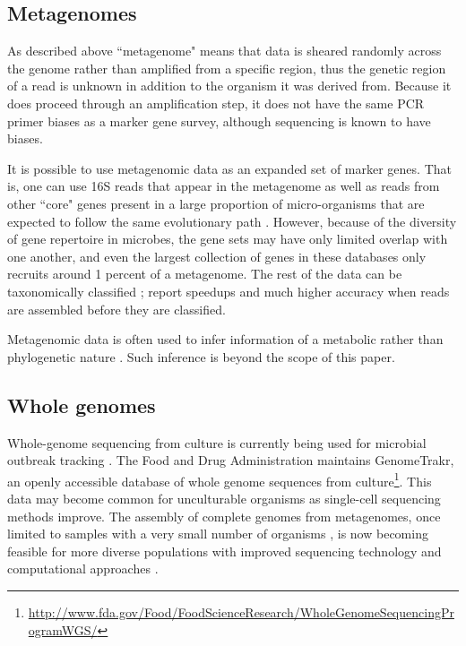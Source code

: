 \documentclass{amsart}
\begin{document}
\subsection{Metagenomes}
As described above ``metagenome" means that data is sheared randomly across the genome rather than amplified from a specific region, thus the genetic region of a read is unknown in addition to the organism it was derived from.
Because it does proceed through an amplification step, it does not have the same PCR primer biases as a marker gene survey, although sequencing is known to have biases.

It is possible to use metagenomic data as an expanded set of marker genes.
That is, one can use 16S reads that appear in the metagenome as well as reads from other ``core" genes present in a large proportion of micro-organisms that are expected to follow the same evolutionary path \citep{von2007quantitative,wu2008amphora,stark2010mltreemap,kembel2011phylogenetic}.
However, because of the diversity of gene repertoire in microbes, the gene sets may have only limited overlap with one another, and even the largest collection of genes in these databases only recruits around 1 percent of a metagenome.
The rest of the data can be taxonomically classified
\citep[methods reviewed by][]{mande2012classification}; \citet{treangen2013metamos} report speedups and much higher accuracy when reads are assembled before they are classified.

Metagenomic data is often used to infer information of a metabolic rather than phylogenetic nature \citep{greenblum2012metagenomic,abubucker2012metabolic}.
Such inference is beyond the scope of this paper.


\subsection{Whole genomes}
Whole-genome sequencing from culture is currently being used for microbial outbreak tracking \citep{koser2012rapid,snitkin2012tracking}.
The Food and Drug Administration maintains GenomeTrakr, an openly accessible database of whole genome sequences from culture\footnote{\url{http://www.fda.gov/Food/FoodScienceResearch/WholeGenomeSequencingProgramWGS/}}.
This data may become common for unculturable organisms as single-cell sequencing methods \citep[reviewed in][]{kalisky2011single} improve.
The assembly of complete genomes from metagenomes, once limited to samples with a very small number of organisms \citep{baker2010enigmatic}, is now becoming feasible for more diverse populations with improved sequencing technology and computational approaches \citep{howe2012assembling,pell2012scaling,iverson2012untangling,emerson2012metagenomic,podell2013assembly}.
\end{document}

